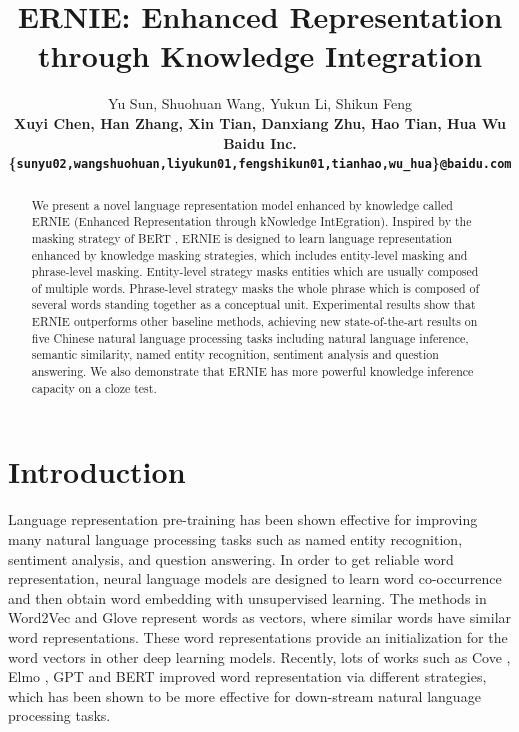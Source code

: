\documentclass[11pt,a4paper]{article}
\title{ERNIE: Enhanced Representation through Knowledge Integration}
\author{
 Yu Sun,
 Shuohuan Wang,
 Yukun Li, 
 Shikun Feng \\
 \bfseries{
 Xuyi Chen,
 Han Zhang,
 Xin Tian,
 Danxiang Zhu,
 Hao Tian,
 Hua Wu}
 \\
 Baidu Inc. \\
 \{\texttt{sunyu02,wangshuohuan,liyukun01,fengshikun01,tianhao,wu\_hua}\}\texttt{@baidu.com} \\
}
\begin{document}

\maketitle
\begin{abstract}
We present a novel language representation model enhanced by knowledge called ERNIE (Enhanced Representation through kNowledge IntEgration). 
Inspired by the masking strategy of BERT \cite{devlin2018bert}, ERNIE is designed to learn language representation enhanced by knowledge masking strategies, which includes entity-level masking and phrase-level masking. Entity-level strategy masks entities which are usually composed of multiple words.
Phrase-level strategy masks the whole phrase which is composed of several words standing together as a conceptual unit.
Experimental results show that ERNIE outperforms other baseline methods, achieving new state-of-the-art results on five Chinese natural language processing tasks including natural language inference, semantic similarity, named entity recognition, sentiment analysis and question answering. 
We also demonstrate that ERNIE has more powerful knowledge inference capacity on a cloze test.
\end{abstract}

\section{Introduction}


Language representation pre-training \cite{mikolov2013efficient, devlin2018bert} has been shown effective for improving many natural language processing tasks such as named entity recognition, sentiment analysis, and question answering. 
In order to get reliable word representation, neural language models are designed to learn word co-occurrence and then obtain word embedding with unsupervised learning.
The methods in Word2Vec \cite{mikolov2013efficient} and Glove \cite{pennington2014glove} represent words as vectors, where similar words have similar word representations. These word representations provide an initialization for the word vectors in other deep learning models. Recently, lots of works such as Cove \cite{mccann2017learned}, Elmo \cite{peters2018deep}, GPT \cite{radford2018improving} and BERT \cite{devlin2018bert} improved word representation via different strategies, which has been shown to be more effective for down-stream natural language processing tasks. 
\end{document}
